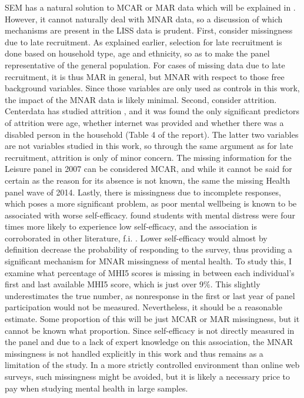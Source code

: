 SEM has a natural solution to MCAR or MAR data which will be explained in .
However, it cannot naturally deal with MNAR data, so a discussion of which mechanisms are present in the LISS data is prudent.
First, consider missingness due to late recruitment. As explained earlier, selection for late recruitment is done based
on household type, age and ethnicity, so as to make the panel representative of the general population. For cases of missing
data due to late recruitment, it is thus MAR in general, but MNAR with respect to those free background variables.
Since those variables are only used as controls in this work, the impact of the MNAR data is likely minimal.
Second, consider attrition. Centerdata has studied attrition \cite{vos2009attrition}, and it was found the only significant
predictors of attrition were age, whether internet was provided and whether there was a disabled person
in the household (Table 4 of the report). The latter two variables are not variables studied in this work, so through
the same argument as for late recruitment, attrition is only of minor concern.
The missing information for the Leisure panel in 2007 can be considered MCAR, and while it cannot be said for certain as
the reason for its absence is not known, the same the missing Health panel wave of 2014.
Lastly, there is missingness due to incomplete responses, which poses a more significant problem, as
poor mental wellbeing is known to be associated with worse self-efficacy.
 found students with mental distress were four times more likely to experience low
self-efficacy, and the association is corroborated in other literature, f.i. .
Lower self-efficacy would almost by definition decrease the probability of responding to the survey, thus providing
a significant mechanism for MNAR missingness of mental health.
To study this, I examine what percentage of MHI5 scores is missing in between each individual's first and last
available MHI5 score, which is just over 9\%. This slightly underestimates the true number, as nonresponse
in the first or last year of panel participation would not be measured. Nevertheless, it should be a reasonable
estimate. Some proportion of this will be just MCAR or MAR missingness, but it cannot be known what proportion.
Since self-efficacy is not directly measured in the panel and due to a lack of expert knowledge on this association,
the MNAR missingness is not handled explicitly in this work and thus remains as a limitation of the study.
In a more strictly controlled environment than online web surveys, such missingness might be avoided, but it is likely
a necessary price to pay when studying mental health in large samples.
